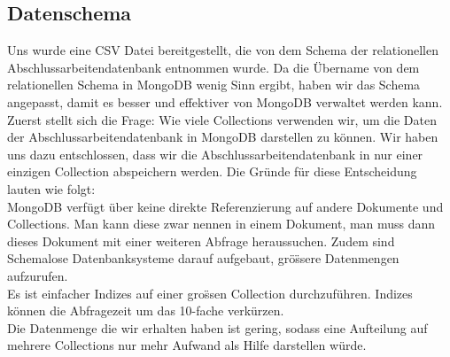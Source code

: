 \subsection{Datenschema}
Uns wurde eine CSV Datei bereitgestellt, die von dem Schema der relationellen Abschlussarbeitendatenbank entnommen wurde. Da die \"Ubername von dem relationellen Schema in MongoDB wenig Sinn ergibt, haben wir das Schema angepasst, damit es besser und effektiver von MongoDB verwaltet werden kann. Zuerst stellt sich die Frage: Wie viele Collections verwenden wir, um die Daten der Abschlussarbeitendatenbank in MongoDB darstellen zu k\"onnen. Wir haben uns dazu entschlossen, dass wir die Abschlussarbeitendatenbank in nur einer einzigen Collection abspeichern werden. Die Gr\"unde f\"ur diese Entscheidung lauten wie folgt:
\\
MongoDB verf\"ugt \"uber keine direkte Referenzierung auf andere Dokumente und Collections. Man kann diese zwar nennen in einem Dokument, man muss dann dieses Dokument mit einer weiteren Abfrage heraussuchen. Zudem sind Schemalose Datenbanksysteme darauf aufgebaut, gr\"o\"ssere Datenmengen aufzurufen.\cite{mongo01}
\\
Es ist einfacher Indizes auf einer gro\"ssen Collection durchzuf\"uhren. Indizes k\"onnen die Abfragezeit um das 10-fache verk\"urzen.
\\
Die Datenmenge die wir erhalten haben ist gering, sodass eine Aufteilung auf mehrere Collections nur mehr Aufwand als Hilfe darstellen w\"urde.
